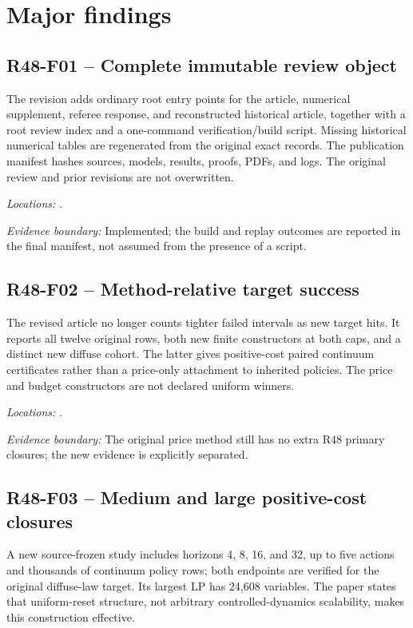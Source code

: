 \section{Major findings}
\subsection{R48-F01 -- Complete immutable review object}
The revision adds ordinary root entry points for the article, numerical supplement, referee response, and reconstructed historical article, together with a root review index and a one-command verification/build script. Missing historical numerical tables are regenerated from the original exact records. The publication manifest hashes sources, models, results, proofs, PDFs, and logs. The original review and prior revisions are not overwritten.

\noindent\emph{Locations:} .

\noindent\emph{Evidence boundary:} Implemented; the build and replay outcomes are reported in the final manifest, not assumed from the presence of a script.

\subsection{R48-F02 -- Method-relative target success}
The revised article no longer counts tighter failed intervals as new target hits. It reports all twelve original rows, both new finite constructors at both caps, and a distinct new diffuse cohort. The latter gives positive-cost paired continuum certificates rather than a price-only attachment to inherited policies. The price and budget constructors are not declared uniform winners.

\noindent\emph{Locations:} .

\noindent\emph{Evidence boundary:} The original price method still has no extra R48 primary closures; the new evidence is explicitly separated.

\subsection{R48-F03 -- Medium and large positive-cost closures}
A new source-frozen study includes horizons 4, 8, 16, and 32, up to five actions and thousands of continuum policy rows; both endpoints are verified for the original diffuse-law target. Its largest LP has 24,608 variables. The paper states that uniform-reset structure, not arbitrary controlled-dynamics scalability, makes this construction effective.

